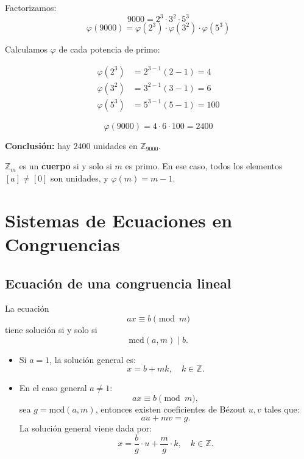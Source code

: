 \documentclass[a4paper,12pt]{article}
\begin{document}
\begin{ejemplo}[title={Cálculo de \(\varphi(9000)\)}]
Factorizamos:
\[
9000 = 2^3 \cdot 3^2 \cdot 5^3
\]
\[
\varphi(9000) = \varphi(2^3) \cdot \varphi(3^2) \cdot \varphi(5^3)
\]

Calculamos \(\varphi\) de cada potencia de primo:

\[
\begin{aligned}
\varphi(2^3) &= 2^{3-1} (2-1) = 4\\
\varphi(3^2) &= 3^{2-1} (3-1) = 6\\
\varphi(5^3) &= 5^{3-1} (5-1) = 100
\end{aligned}
\]

\[
\varphi(9000) = 4 \cdot 6 \cdot 100 = 2400
\]

\textbf{Conclusión:} hay \(2400\) unidades en \(\mathbb{Z}_{9000}\).
\end{ejemplo}


\begin{procedimiento}[title={Cuándo \(\mathbb{Z}_m\) es un cuerpo}]
\(\mathbb{Z}_m\) es un \textbf{cuerpo} si y solo si \(m\) es primo.  
En ese caso, todos los elementos \([a] \neq [0]\) son unidades, y \(\varphi(m) = m-1\).
\end{procedimiento}

\section{Sistemas de Ecuaciones en Congruencias}


\subsection{Ecuación de una congruencia lineal}

\begin{procedimiento}[title={Ecuación general}]
La ecuación
\[
a x \equiv b \pmod{m}
\]
tiene solución si y solo si
\[
\text{mcd}(a,m) \mid b.
\]

\begin{itemize}
    \item Si \(a = 1\), la solución general es:
    \[
    x = b + m k, \quad k \in \mathbb{Z}.
    \]
    \item En el caso general \(a \neq 1\):
    \[
    a x \equiv b \pmod{m},
    \]
    sea \(g = \text{mcd}(a,m)\), entonces existen coeficientes de Bézout \(u, v\) tales que:
    \[
    a u + m v = g.
    \]
    La solución general viene dada por:
    \[
    x = \frac{b}{g} \cdot u + \frac{m}{g} \cdot k, \quad k \in \mathbb{Z}.
    \]
\end{itemize}
\end{procedimiento}
\end{document}
